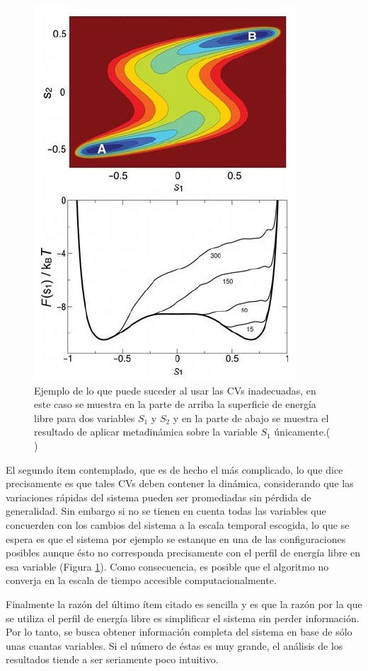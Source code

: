 \documentclass [11pt]{article}
\begin{document}
\begin{figure}[t]
\centering
\includegraphics[width=0.6\linewidth]{CVs}
\caption{Ejemplo de lo que puede suceder al usar las CVs inadecuadas, en este caso se muestra en la parte de arriba la superficie de energía libre para dos variables $S_1$ y $S_2$ y en la parte de abajo se muestra el resultado de aplicar metadinámica sobre la variable $S_1$ únicamente.({\color{red} \cite{barducci}})}
\label{error_CV}
\end{figure}

El segundo ítem contemplado, que es de hecho el más complicado, lo que dice precisamente es que tales CVs deben contener la dinámica, considerando que las variaciones rápidas del sistema pueden ser promediadas sin pérdida de generalidad. Sin embargo si no se tienen en cuenta todas las variables que concuerden con los cambios del sistema a la escala temporal escogida, lo que se espera es que el sistema por ejemplo se estanque en una de las configuraciones posibles aunque ésto no corresponda precisamente con el perfil de energía libre en esa variable (Figura \ref{error_CV}). Como consecuencia, es posible que el algoritmo no converja en la escala de tiempo accesible computacionalmente.

Finalmente la razón del último ítem citado es sencilla y es que la razón por la que se utiliza el perfil de energía libre es simplificar el sistema sin perder información. Por lo tanto, se busca obtener información completa del sistema en base de sólo unas cuantas variables. Si el número de éstas es muy grande, el análisis de los resultados tiende a ser seriamente poco intuitivo.\\
\end{document}
